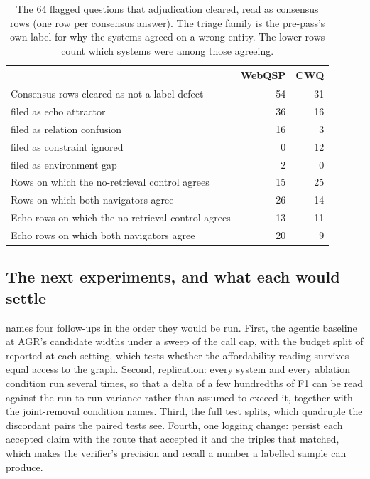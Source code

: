 \begin{table}[!tb]
  \begin{center}
    \caption{The $64$ flagged questions that adjudication cleared, read
      as consensus rows (one row per consensus answer). The triage
      family is the pre-pass's own label for why the systems agreed on
      a wrong entity. The lower rows count which systems were among
      those agreeing.}
    \label{tab:consensus}
    \footnotesize
    \begin{tabular}{|l|r|r|}
      \hline
      & \textbf{WebQSP} & \textbf{CWQ} \\
      \hline
      Consensus rows cleared as not a label defect & 54 & 31 \\
      \quad filed as echo attractor & 36 & 16 \\
      \quad filed as relation confusion & 16 & 3 \\
      \quad filed as constraint ignored & 0 & 12 \\
      \quad filed as environment gap & 2 & 0 \\
      \hline
      Rows on which the no-retrieval control agrees & 15 & 25 \\
      Rows on which both navigators agree & 26 & 14 \\
      Echo rows on which the no-retrieval control agrees & 13 & 11 \\
      Echo rows on which both navigators agree & 20 & 9 \\
      \hline
    \end{tabular}
  \end{center}
\end{table}

\subsection{The next experiments, and what each would
  settle}\label{app:experiments}

 names four follow-ups in the order they would be run.
First, the agentic baseline at AGR's candidate widths under a sweep of
the call cap, with the budget split of  reported at
each setting, which tests whether the affordability reading survives
equal access to the graph. Second, replication: every system and every
ablation condition run several times, so that a delta of a few
hundredths of F1 can be read against the run-to-run variance rather than
assumed to exceed it, together with the joint-removal condition
 names. Third, the full test splits, which quadruple the
discordant pairs the paired tests see. Fourth, one logging change:
persist each accepted claim with the route that accepted it and the
triples that matched, which makes the verifier's precision and recall a
number a labelled sample can produce.

